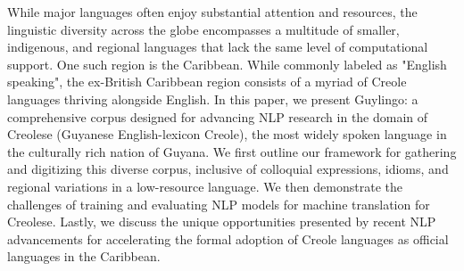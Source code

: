 While major languages often enjoy substantial attention and resources, the linguistic diversity across the globe encompasses a multitude of smaller, indigenous, and regional languages that lack the same level of computational support. One such region is the Caribbean. While commonly labeled as "English speaking", the ex-British Caribbean region consists of a myriad of Creole languages thriving alongside English. In this paper, we present Guylingo: a comprehensive corpus designed for advancing NLP research in the domain of Creolese (Guyanese English-lexicon Creole), the most widely spoken language in the culturally rich nation of Guyana. We first outline our framework for gathering and digitizing this diverse corpus, inclusive of colloquial expressions, idioms, and regional variations in a low-resource language. We then demonstrate the challenges of training and evaluating NLP models for machine translation for Creolese. Lastly, we discuss the unique opportunities presented by recent NLP advancements for accelerating the formal adoption of Creole languages as official languages in the Caribbean.